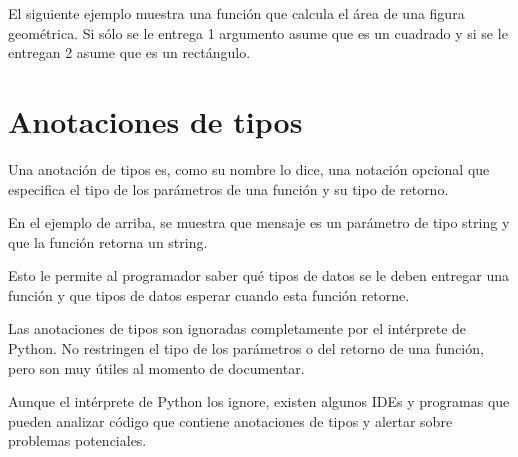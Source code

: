 
El siguiente ejemplo muestra una función que calcula el área de una figura geométrica.
Si sólo se le entrega 1 argumento asume que es un cuadrado y si se le entregan 2 asume que es un rectángulo.



\section{Anotaciones de tipos}

Una anotación de tipos es, como su nombre lo dice, una notación opcional que especifica el tipo de los parámetros de una función y su tipo de retorno.


En el ejemplo de arriba, se muestra que mensaje es un parámetro de tipo string y que la función  retorna un string.

Esto le permite al programador saber qué tipos de datos se le deben entregar una función y que tipos de datos esperar cuando esta función retorne.

Las anotaciones de tipos son ignoradas completamente por el intérprete de Python.
No restringen el tipo de los parámetros o del retorno de una función, pero son muy útiles al momento de documentar.


Aunque el intérprete de Python los ignore, existen algunos IDEs y programas que pueden analizar código que contiene anotaciones de tipos y alertar sobre problemas potenciales.

\clearpage